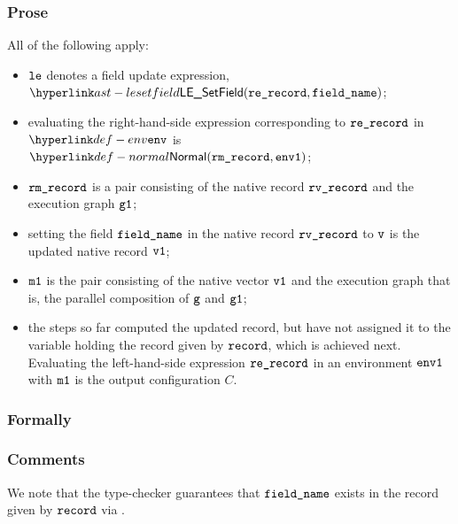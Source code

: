 \subsubsection{Prose}
All of the following apply:
\begin{itemize}
  \item $\vle$ denotes a field update expression, $\LESetField(\rerecord, \fieldname)$;
  \item evaluating the right-hand-side expression corresponding to $\rerecord$
  in $\env$ is $\Normal(\rmrecord, \envone)$\ProseOrAbnormal;
  \item $\rmrecord$ is a pair consisting of the native record $\rvrecord$ and
  the execution graph $\vgone$;
  \item setting the field $\fieldname$ in the native record $\rvrecord$ to $\vv$
  is the updated native record $\vvone$;
  \item $\vmone$ is the pair consisting of the native vector $\vvone$ and the
  execution graph that is, the parallel composition of $\vg$ and $\vgone$;
  \item the steps so far computed the updated record, but have not assigned it to
  the variable holding the record given by $\record$, which is achieved next.
  Evaluating the left-hand-side expression $\rerecord$ in an environment $\envone$ with $\vmone$
  is the output configuration $C$.
\end{itemize}
\subsubsection{Formally}
\begin{mathpar}
\end{mathpar}

\subsubsection{Comments}
We note that the type-checker guarantees that $\fieldname$ exists in the record given by $\record$
via .

